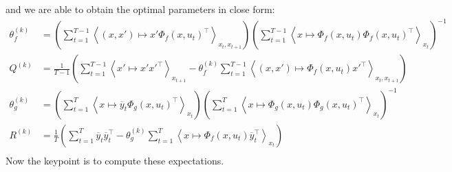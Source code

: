and we are able to obtain the optimal parameters in close form:
\begin{align*}
  \theta_f^{(k)} &=
    \left(
      \sum_{t=1}^{T-1}{\left< (x,x') \mapsto x' \Phi_f(x,u_t)^{\top} \right>_{x_t,x_{t+1}}}
    \right)
    \left(
      \sum_{t=1}^{T-1}{\left< x \mapsto \Phi_f(x, u_t)\Phi_f(x,u_t)^{\top} \right>_{x_t}}
    \right)^{-1}
  \\
  Q^{(k)} &=
    \frac{1}{T-1}
    \left(
      \sum_{t=1}^{T-1}{\left< x' \mapsto x'x'^{\top} \right>_{x_{t+1}}} -
      \theta_f^{(k)} \sum_{t=1}^{T-1}{\left< (x,x') \mapsto \Phi_f(x, u_t) x'^{\top} \right>_{x_t,x_{t+1}}}
    \right)
  \\
  \theta_g^{(k)} &=
    \left(
      \sum_{t=1}^{T}{\left< x \mapsto \overline{y}_{t}\Phi_g(x,u_t)^{\top} \right>_{x_t}}
    \right)
    \left(
      \sum_{t=1}^{T}{\left< x \mapsto \Phi_g(x,u_t)\Phi_g(x,u_t)^{\top} \right>_{x_t}}
    \right)^{-1}
  \\
  R^{(k)} &=
    \frac{1}{T}
    \left(
      \sum_{t=1}^{T}{\overline{y}_t \overline{y}_t^{\top}} -
      \theta_g^{(k)} \sum_{t=1}^{T}{\left< x \mapsto \Phi_f(x, u_t) \overline{y}_t^{\top} \right>_{x_t}}
    \right)
  \\
\end{align*}
Now the keypoint is to compute these expectations.

